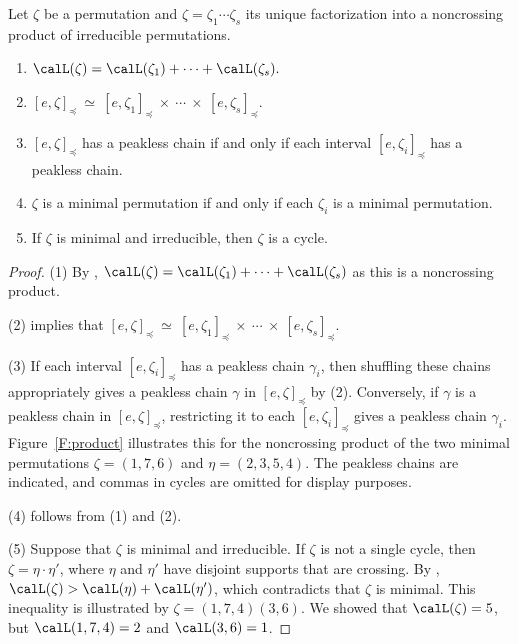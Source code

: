 \begin{lemma}\label{L:properties-noncrossing-products}
    Let $\zeta$ be a permutation and $\zeta=\zeta_1\dotsb \zeta_s$ its unique
    factorization into a noncrossing product of irreducible permutations.
    \begin{enumerate}
        \item
            $\calL(\zeta)= \calL(\zeta_1)+\dotsb+\calL(\zeta_s).$

        \item
            $[e,\zeta]_\preceq\ \simeq\  [e,\zeta_1]_\preceq\ \times\ \dotsb\ \times\  [e,\zeta_s]_\preceq.$

        \item
            $[e,\zeta]_\preceq$ has a peakless chain if and only if each interval $[e,\zeta_i]_\preceq$ has a peakless chain.

        \item
            $\zeta$ is a minimal permutation if and only if each $\zeta_i$ is a minimal permutation.

        \item
            If $\zeta$ is minimal and irreducible, then $\zeta$ is a cycle.
    \end{enumerate}
\end{lemma}

\begin{proof}
    (1) By \cite[Lem.~3.3.1]{BS-Bruhat}, $\calL(\zeta)= \calL(\zeta_1)+\dotsb+\calL(\zeta_s)$ as this is a noncrossing product.

    (2) \cite[Lem.~3.3.3]{BS-Bruhat} implies that $[e,\zeta]_\preceq\ \simeq\  [e,\zeta_1]_\preceq\ \times\ \dotsb\ \times\  [e,\zeta_s]_\preceq$.

    (3) If each interval $[e, \zeta_i]_{\preceq}$ has a peakless chain
        $\gamma_i$, then shuffling these chains appropriately gives a peakless
        chain $\gamma$ in $[e,\zeta]_\preceq$ by (2). Conversely, if $\gamma$ is
        a peakless chain in  $[e,\zeta]_\preceq$, restricting it to each
        $[e,\zeta_i]_\preceq$ gives a peakless chain $\gamma_i$.
        Figure~\ref{F:product} illustrates this
        for the noncrossing product
        of the two minimal permutations $\zeta=(1,7,6)$ and $\eta=(2,3,5,4)$. The
        peakless chains are indicated, and commas in cycles are omitted for display
        purposes.

    (4) follows from (1) and (2).

    (5) Suppose that $\zeta$ is minimal and irreducible.
        If $\zeta$ is not a single cycle, then $\zeta=\eta\cdot \eta'$,
        where $\eta$ and $\eta'$ have disjoint supports that are crossing.
        By \cite[Lem.~3.3.1]{BS-Bruhat}, $\calL(\zeta)> \calL(\eta) + \calL(\eta')$, which contradicts that $\zeta$ is minimal.
        This inequality is illustrated by $\zeta=(1,7,4)(3,6)$.
        We showed that $\calL(\zeta)=5$, but $\calL(1,7,4) = 2$ and $\calL(3,6)=1$.
\end{proof}


